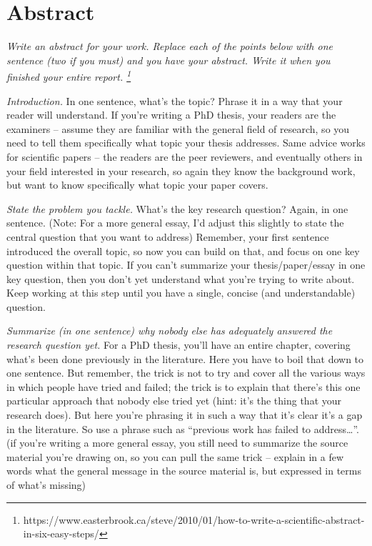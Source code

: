 \documentclass[
  numbers=noenddot,
  english,  %
  a4paper,  %
  twoside,  %
  bibliography=totoc,
  headsepline,
  cleardoublepage=empty,
  parskip=half,
  draft=false
]{scrbook}
\theoremstyle{break}
\begin{document}
\raggedbottom
{}
\Titelblatt

\pagestyle{plain.scrheadings}
\renewcommand*{\chapterpagestyle}{plain.scrheadings}

\section*{Abstract}
\emph{Write an abstract for your work.
  Replace each of the points below with one sentence (two if you must) and you have your abstract.
  Write it when you finished your entire report.
  \footnote{https://www.easterbrook.ca/steve/2010/01/how-to-write-a-scientific-abstract-in-six-easy-steps/}}

\emph{Introduction.}
In one sentence, what’s the topic?
Phrase it in a way that your reader will understand.
If you’re writing a PhD thesis, your readers are the examiners – assume they are familiar with the general field of research, so you need to tell them specifically what topic your thesis addresses.
Same advice works for scientific papers – the readers are the peer reviewers, and eventually others in your field interested in your research, so again they know the background work, but want to know specifically what topic your paper covers.

\emph{State the problem you tackle.}
What’s the key research question?
Again, in one sentence.
(Note: For a more general essay, I’d adjust this slightly to state the central question that you want to address)
Remember, your first sentence introduced the overall topic, so now you can build on that, and focus on one key question within that topic.
If you can’t summarize your thesis/paper/essay in one key question, then you don’t yet understand what you’re trying to write about.
Keep working at this step until you have a single, concise (and understandable) question.

\emph{Summarize (in one sentence) why nobody else has adequately answered the research question yet.}
For a PhD thesis, you’ll have an entire chapter, covering what’s been done previously in the literature.
Here you have to boil that down to one sentence.
But remember, the trick is not to try and cover all the various ways in which people have tried and failed; the trick is to explain that there’s this one particular approach that nobody else tried yet (hint: it’s the thing that your research does).
But here you’re phrasing it in such a way that it’s clear it’s a gap in the literature.
So use a phrase such as “previous work has failed to address…”.
(if you’re writing a more general essay, you still need to summarize the source material you’re drawing on, so you can pull the same trick – explain in a few words what the general message in the source material is, but expressed in terms of what’s missing)
\end{document}
